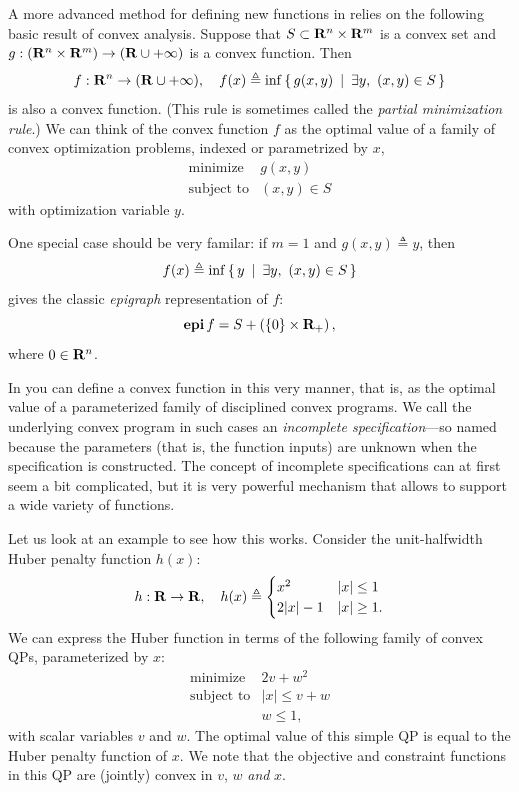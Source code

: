 \documentclass[12pt]{article}
\begin{document}
A more advanced method for defining new functions in \cvx
relies on the following basic result of convex analysis.
Suppose that $S\subset\R^n\times\R^m$ is a convex set and 
$g:(\R^n\times\R^m)\rightarrow(\R\cup+\infty)$ is a convex function. 
Then
\begin{equation}
	\label{eq:partial}
	f:\R^n\rightarrow(\R\cup+\infty), \quad 
f(x) \triangleq \inf\Condset{g(x,y)}{\exists y,~(x,y)\in S }
\end{equation}
is also a convex function. (This rule is sometimes called
the \emph{partial minimization rule}.)
We can think of the convex function $f$ as the optimal value of
a family of convex optimization problems, indexed or parametrized
by $x$,
\[
\begin{array}{ll}
\mbox{minimize} & g(x,y) \\
\mbox{subject to} & (x,y) \in S
\end{array}
\]
with optimization variable $y$.

One special case should be very familar: if $m=1$ and
$g(x,y)\triangleq y$, then
\[
	f(x) \triangleq \inf\left\{\,y\,~|~\,\exists y,~(x,y)\in S\,\right\}
\]
gives the classic \emph{epigraph} representation of $f$:
\[
\operatorname{\textbf{epi}} f = S+ \left( \{ 0 \} \times \mathbf{R}_+ \right),
\]
where $0 \in \mathbf{R}^n$.

In \cvx you can define a convex
function in this very manner, that is, as the optimal value of a 
parameterized family of disciplined convex programs. 
We call the underlying convex program in such cases
an \emph{incomplete specification}---so named because
the parameters (that is, the function inputs)
are unknown when the specification is
constructed. The concept of incomplete 
specifications can at first seem a bit complicated,
but it is very powerful mechanism that allows \cvx
to support a wide variety of functions.

Let us look at an example to see how this works.
Consider the unit-halfwidth Huber penalty function $h(x)$:
\begin{equation}
	h:\R\rightarrow\R, \quad h(x) \eqbydef 
\Cases{ x^2 & |x| \leq 1 \\ 2|x|-1 & |x| \geq 1 .}
\end{equation}
We can express the Huber function in terms of the following family of 
convex QPs, parameterized by $x$:
\begin{equation}
	\begin{array}{ll}
		\text{minimize}   & 2 v + w^2 \\
		\text{subject to} & | x | \leq v + w \\
		                  & w \leq 1,
	\end{array}
\end{equation}
with scalar variables $v$ and $w$.
The optimal value of this simple QP is equal to the Huber
penalty function of $x$.
We note that the objective and constraint functions in this QP are
(jointly) convex in $v$, $w$ \emph{and} $x$.
\end{document}
